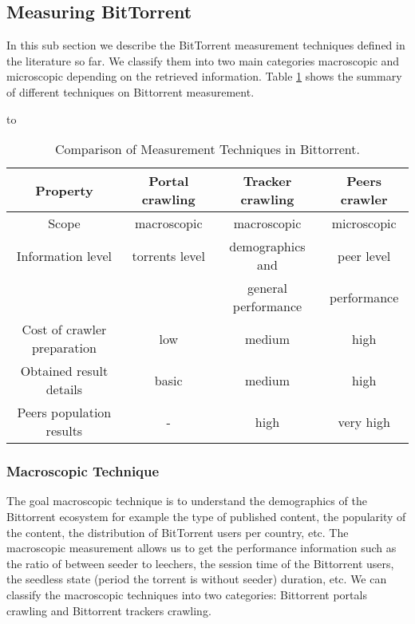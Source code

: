 \subsection{Measuring BitTorrent}
In this sub section we describe the BitTorrent measurement techniques defined in the literature so far. 
We classify them into two main categories macroscopic and microscopic depending on the retrieved information. 
Table \ref{tab:measurementtechniques} shows the summary of different techniques on Bittorrent measurement. 

\begin{table}[thb]
\caption{Comparison of Measurement Techniques in Bittorrent.}
\label{tab:measurementtechniques}
\hbox to\hsize{\hfil}
\begin{tabular}{c|c|c|c}\hline\hline
Property & Portal crawling & Tracker crawling & Peers crawler \\ \hline
Scope & macroscopic & macroscopic & microscopic \\ \hline
Information level & torrents level & demographics and  & peer level \\
 &  & general performance  & performance \\ \hline
Cost of crawler preparation & low & medium & high \\ \hline
Obtained result details & basic & medium & high \\ \hline
Peers population results & - & high & very high \\ \hline
\end{tabular}
\end{table}

\subsubsection{Macroscopic Technique}
The goal macroscopic technique is to understand the demographics of the Bittorrent ecosystem for example the type of published content, the popularity of the content, the distribution of BitTorrent users per country, etc. 
The macroscopic measurement allows us to get the performance information such as the ratio of between seeder to leechers, the session time of the Bittorrent users, the seedless state (period the torrent is without seeder) duration, etc.
We can classify the macroscopic techniques into two categories: Bittorrent portals crawling and Bittorrent trackers crawling.

